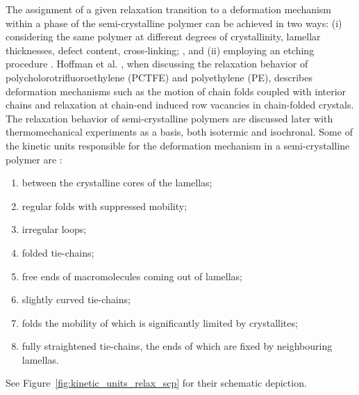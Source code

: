 The assignment of a given relaxation transition to a deformation mechanism within a phase of the semi-crystalline polymer can be achieved in two ways: (i) considering the same polymer at different degrees of crystallinity, lamellar thicknesses, defect content, cross-linking; \citep{ferryViscoelasticPropertiesPolymers1980}, and (ii) employing an etching procedure \citep{arzhakovRelaxationPhysicalMechanical2019}.
Hoffman et al. \citep{hoffmanAnalysisRelaxationsPolychlorotrifluoroethylene2007}, when discussing the relaxation behavior of polycholorotrifluoroethylene (PCTFE) and polyethylene (PE), describes deformation mechanisms such as the motion of chain folds coupled with interior chains and relaxation at chain-end induced row vacancies in chain-folded crystals.
The relaxation behavior of semi-crystalline polymers are discussed later with thermomechanical experiments as a basis, both isotermic and isochronal.
Some of the kinetic units responsible for the deformation mechanism in a semi-crystalline polymer are \citep{arzhakovRelaxationPhysicalMechanical2019}:
\begin{enumerate}
	\item between the crystalline cores of the lamellas;
	\item regular folds with suppressed mobility;
	\item irregular loops;
	\item folded tie-chains;
	\item free ends of macromolecules coming out of lamellas;
	\item slightly curved tie-chains;
	\item folds the mobility of which is significantly limited by crystallites;
	\item fully straightened tie-chains, the ends of which are fixed by neighbouring lamellas.
\end{enumerate}
See Figure~\ref{fig:kinetic_units_relax_scp} for their schematic depiction.
